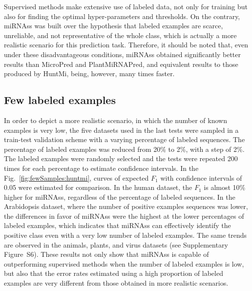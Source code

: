 \documentclass{article}
\begin{document}
Supervised methods make extensive use of labeled data, not only for training but also for finding the optimal hyper-parameters and thresholds. On the contrary, miRNAss was built over the hypothesis that labeled examples are scarce, unreliable, and not representative of the whole class, which is actually a more realistic scenario for this prediction task. Therefore, it should be noted that, even under these disadvantageous conditions, miRNAss obtained significantly better results than MicroPred and PlantMiRNAPred, and equivalent results to those produced by HuntMi, being, however, many times faster.

\subsection{Few labeled examples}
In order to depict a more realistic scenario, in which the number of known examples is very low, the five datasets used in the last tests were sampled in a train-test validation scheme with a varying percentage of labeled sequences. The percentage of labeled examples was reduced from 20\% to 2\%, with a step of 2\%. The labeled examples were randomly selected and the tests were repeated 200 times for each percentage to estimate confidence intervals. In the Fig.~\ref{fig:fewSamples:huntmi}, curves of expected $F_{1}$ with confidence intervals of 0.05 were estimated for comparison. In the human dataset, the $F_{1}$ is almost 10\% higher for miRNAss, regardless of the percentage of labeled sequences. In the Arabidopsis dataset, where the number of positive examples sequences was lower, the differences in favor of miRNAss were the highest at the lower percentages of labeled examples, which indicates that miRNAss can effectively identify the positive class even  with a very low number of labeled examples. The same trends are observed in the animals, plants, and virus datasets (see Supplementary Figure~S6). 
These results not only show that miRNAss is capable of outperforming supervised methods when the number of labeled examples is low, but also that the error rates estimated using a high proportion of labeled examples are very different from those obtained in more realistic scenarios.
\end{document}
